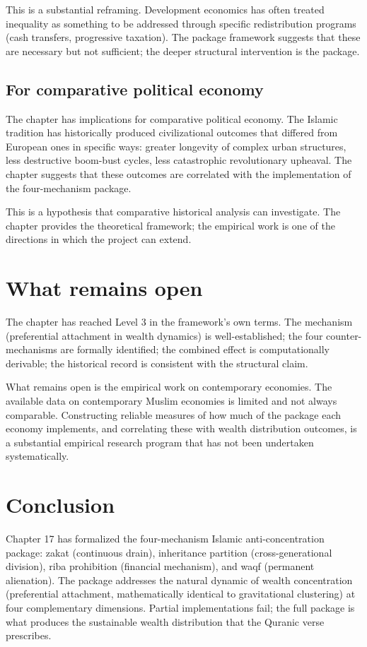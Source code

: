 This is a substantial reframing. Development economics has often
treated inequality as something to be addressed through specific
redistribution programs (cash transfers, progressive taxation).
The package framework suggests that these are necessary but not
sufficient; the deeper structural intervention is the package.

\subsection{For comparative political economy}

The chapter has implications for comparative political economy.
The Islamic tradition has historically produced civilizational
outcomes that differed from European ones in specific ways:
greater longevity of complex urban structures, less destructive
boom-bust cycles, less catastrophic revolutionary upheaval. The
chapter suggests that these outcomes are correlated with the
implementation of the four-mechanism package.

This is a hypothesis that comparative historical analysis can
investigate. The chapter provides the theoretical framework; the
empirical work is one of the directions in which the project can
extend.

\section{What remains open}

The chapter has reached Level 3 in the framework's own terms. The
mechanism (preferential attachment in wealth dynamics) is well-established;
the four counter-mechanisms are formally identified; the
combined effect is computationally derivable; the historical
record is consistent with the structural claim.

What remains open is the empirical work on contemporary economies.
The available data on contemporary Muslim economies is limited
and not always comparable. Constructing reliable measures of how
much of the package each economy implements, and correlating these
with wealth distribution outcomes, is a substantial empirical
research program that has not been undertaken systematically.

\section{Conclusion}

Chapter 17 has formalized the four-mechanism Islamic
anti-concentration package: zakat (continuous drain), inheritance
partition (cross-generational division), riba prohibition
(financial mechanism), and waqf (permanent alienation). The
package addresses the natural dynamic of wealth concentration
(preferential attachment, mathematically identical to gravitational
clustering) at four complementary dimensions. Partial
implementations fail; the full package is what produces the
sustainable wealth distribution that the Quranic verse 
prescribes.

